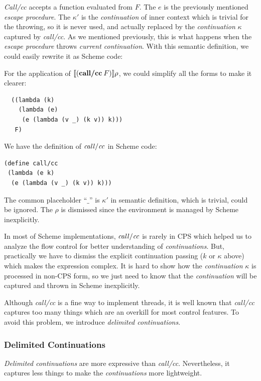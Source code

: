 \documentclass[numbers,numberedpars]{sigplanconf}
\begin{document}
{\it Call/cc} accepts a function evaluated from $F$. The $e$ is the previously mentioned {\it escape procedure}.
The $\kappa'$ is the {\it continuation} of inner context which is trivial for the throwing, so it is never used, and actually replaced
by the {\it continuation} $\kappa$ captured by {\it call/cc}. As we mentioned previously, this is what happens when the {\it escape procedure}
throws {\it current continuation}. With this semantic definition, we could easily rewrite it as Scheme code:

For the application of $\llbracket{(\text{{\bf call/cc}}\:F)}\rrbracket\rho$, we could simplify all the forms to make it clearer:
\begin{lstlisting}
  ((lambda (k)
    (lambda (e)
     (e (lambda (v _) (k v)) k)))
   F)
\end{lstlisting}

We have the definition of ${\it call/cc}$ in Scheme code:
\begin{lstlisting}
(define call/cc
 (lambda (e k)
  (e (lambda (v _) (k v)) k)))
\end{lstlisting}

The common placeholder  ``$\_$'' is $\kappa'$ in semantic definition, which is trivial, could be ignored.
The $\rho$ is dismissed since the environment is managed by Scheme inexplicitly.

In most of Scheme implementations, ${\it call/cc}$ is rarely in CPS which helped us to analyze the flow control for better understanding of {\it continuations}.
But, practically we have to dismiss the explicit continuation passing ($k$ or $\kappa$ above) which makes the expression complex.
It is hard to show how the {\it continuation} $\kappa$ is processed in non-CPS form, so we just need to know that the {\it continuation} will be captured and
thrown in Scheme inexplicitly.

Although {\it call/cc} is a fine way to implement threads, it is well known that {\it call/cc} captures too many things which are an overkill for most control features. To avoid this problem, we introduce {\it delimited continuations}.

\subsubsection{Delimited Continuations} \label{Delimited Continuations}

{\it Delimited continuations} are more expressive than {\it call/cc}.
Nevertheless, it captures less things to make the {\it continuations} more lightweight.
\end{document}
